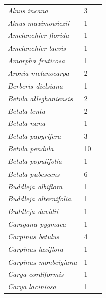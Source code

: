 \documentclass[11pt]{article}
\begin{document}
\begin{longtable}{p{}p{}p{}}
  \emph{Alnus incana} &   3 & \emph{\citep{flynn2018,Heide:1993,zohner2016}} \\ 
  \emph{Alnus maximowiczii} &   1 & \emph{\citep{zohner2016}} \\ 
  \emph{Amelanchier florida} &   1 & \emph{\citep{zohner2016}} \\ 
  \emph{Amelanchier laevis} &   1 & \emph{\citep{zohner2016}} \\ 
  \emph{Amorpha fruticosa} &   1 & \emph{\citep{Laube:2014a}} \\ 
  \emph{Aronia melanocarpa} &   2 & \emph{\citep{flynn2018,zohner2016}} \\ 
  \emph{Berberis dielsiana} &   1 & \emph{\citep{zohner2016}} \\ 
  \emph{Betula alleghaniensis} &   2 & \emph{\citep{Calme:1994aa,flynn2018}} \\ 
  \emph{Betula lenta} &   2 & \emph{\citep{flynn2018,zohner2016}} \\ 
  \emph{Betula nana} &   1 & \emph{\citep{zohner2016}} \\ 
  \emph{Betula papyrifera} &   3 & \emph{\citep{flynn2018,man17,nanninga17}} \\ 
  \emph{Betula pendula} &  10 & \emph{\citep{Basler:2012,Heide:1993,Laube:2014a,Laube:2014b,Li:2005aa,Linkosalo:2006aa,Myking:1995,Myking:1998aa,Rinne:1997aa,Skuterud:1994aa}} \\ 
  \emph{Betula populifolia} &   1 & \emph{\citep{zohner2016}} \\ 
  \emph{Betula pubescens} &   6 & \emph{\citep{Caffarra:2011a,Caffarra:2011b,Heide:1993,Myking:1995,Myking:1997aa,Rinne:1994}} \\ 
  \emph{Buddleja albiflora} &   1 & \emph{\citep{zohner2016}} \\ 
  \emph{Buddleja alternifolia} &   1 & \emph{\citep{zohner2016}} \\ 
  \emph{Buddleja davidii} &   1 & \emph{\citep{zohner2016}} \\ 
  \emph{Caragana pygmaea} &   1 & \emph{\citep{zohner2016}} \\ 
  \emph{Carpinus betulus} &   4 & \emph{\citep{Heide:1993a,Laube:2014a,vitra17,zohner2016}} \\ 
  \emph{Carpinus laxiflora} &   1 & \emph{\citep{zohner2016}} \\ 
  \emph{Carpinus monbeigiana} &   1 & \emph{\citep{zohner2016}} \\ 
  \emph{Carya cordiformis} &   1 & \emph{\citep{zohner2016}} \\ 
  \emph{Carya laciniosa} &   1 & \emph{\citep{zohner2016}} \\ 

\end{longtable}
\end{document}
